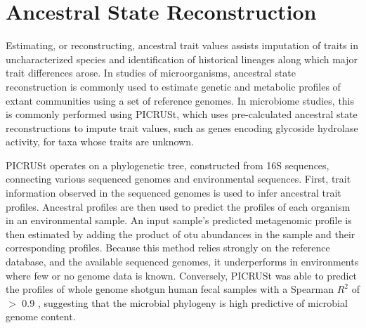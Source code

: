 \section{Ancestral State Reconstruction}
Estimating, or reconstructing, ancestral trait values assists imputation of traits in uncharacterized species and identification of historical lineages along which major trait differences arose. In studies of microorganisms, ancestral state reconstruction is commonly used to estimate genetic and metabolic profiles of extant communities using a set of reference genomes. In microbiome studies, this is commonly performed using PICRUSt\cite{picrust}, which uses pre-calculated ancestral state reconstructions to impute trait values, such as genes encoding glycoside hydrolase activity, for taxa whose traits are unknown.\par
PICRUSt operates on a phylogenetic tree, constructed from 16S sequences, connecting various sequenced genomes and environmental sequences. First, trait information observed in the sequenced genomes is used to infer ancestral trait profiles. Ancestral profiles are then used to predict the profiles of each organism in an environmental sample. An input sample's predicted metagenomic profile is then estimated by adding the product of \gls{otu} abundances in the sample and their corresponding profiles. Because this method relies strongly on the reference database, and the available sequenced genomes, it underperforms in environments where few or no genome data is known. Conversely, PICRUSt was able to predict the profiles of whole genome shotgun human fecal samples with a Spearman $R^2$ of $>$ 0.9 \cite{picrust}, suggesting that the microbial phylogeny is high predictive of microbial genome content.\par
